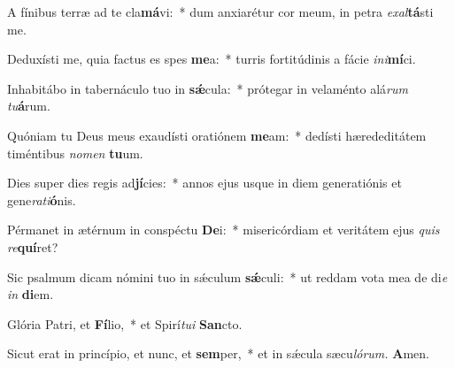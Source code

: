 \item A fínibus terræ ad te cla\textbf{má}vi:~* dum anxiarétur cor meum, in petra \textit{exal}\textbf{tá}sti me.
\item Deduxísti me, quia factus es spes \textbf{me}a:~* turris fortitúdinis a fácie \textit{ini}\textbf{mí}ci.
\item Inhabitábo in tabernáculo tuo in \textbf{sǽ}cula:~* prótegar in velaménto alá\textit{rum} \textit{tu}\textbf{á}rum.
\item Quóniam tu Deus meus exaudísti oratiónem \textbf{me}am:~* dedísti hærededitátem timéntibus \textit{nomen} \textbf{tu}um.
\item Dies super dies regis ad\textbf{jí}cies:~* annos ejus usque in diem generatiónis et gene\tinyhspace\textit{rati}\textbf{ó}nis.
\item Pérmanet in ætérnum in conspéctu \textbf{De}i:~* misericórdiam et veritátem ejus \textit{quis} \textit{re}\textbf{quí}ret?
\item Sic psalmum dicam nómini tuo in sǽculum \textbf{sǽ}culi:~* ut reddam vota mea de di\tinyhspace\textit{e} \textit{in} \textbf{di}em.
\item Glória Patri, et \textbf{Fí}lio,~* et Spirí\tinyhspace\textit{tui} \textbf{San}cto.
\item Sicut erat in princípio, et nunc, et \textbf{sem}per,~* et in sǽcula sæcu\tinyhspace\textit{lórum.} \textbf{A}men.